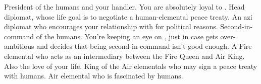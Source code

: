 \documentclass[char]{elementals}
\begin{document}
\begin{contacts}
  \contact{\cLeader{}} President of the humans and your handler.  You are absolutely loyal to .
  \contact{\cAvatar{}} Head diplomat, whose life goal is to negotiate a human-elemental peace treaty.
  \contact{\cDiplomat{}} An azi diplomat who encourages your relationship with \cJuliet{} for political reasons.
  \contact{\cDema{}} Second-in-command of the humans.  You're keeping an eye on \cDema{\them}, just in case  gets over-ambitious and decides that being second-in-command isn't good enough.
  \contact{\cJuliet{}} A Fire elemental who acts as an intermediary between the Fire Queen and Air King.  Also the love of your life.
  \contact{\cKing{}} King of the Air elementals who may sign a peace treaty with humans.
  \contact{\Naturalist{}} Air elemental who is fascinated by humans.
\end{contacts}
\end{document}
